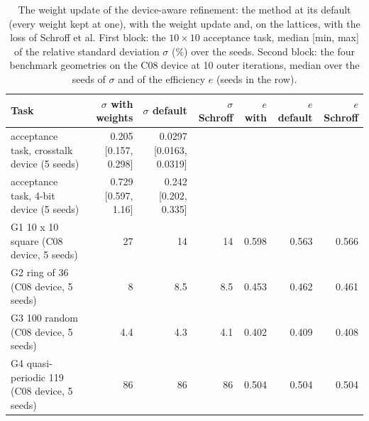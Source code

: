 \begin{table}[t]\centering\footnotesize
\caption{The weight update of the device-aware refinement: the method at its default (every weight kept at one), with the weight update and, on the lattices, with the loss of Schroff et al. First block: the $10\times10$ acceptance task, median [min, max] of the relative standard deviation $\sigma$ (\%) over the seeds. Second block: the four benchmark geometries on the C08 device at 10 outer iterations, median over the seeds of $\sigma$ and of the efficiency $e$ (seeds in the row).}\label{tab:b1-weights}
\begin{tabular}{@{}l r r r r r r@{}}\toprule Task & $\sigma$ with weights & $\sigma$ default & $\sigma$ Schroff & $e$ with & $e$ default & $e$ Schroff\\\midrule
acceptance task, crosstalk device (5 seeds) & 0.205 [0.157, 0.298] & 0.0297 [0.0163, 0.0319] & & & & \\
acceptance task, 4-bit device (5 seeds) & 0.729 [0.597, 1.16] & 0.242 [0.202, 0.335] & & & & \\
G1 10 x 10 square (C08 device, 5 seeds) & 27 & 14 & 14 & 0.598 & 0.563 & 0.566\\
G2 ring of 36 (C08 device, 5 seeds) & 8 & 8.5 & 8.5 & 0.453 & 0.462 & 0.461\\
G3 100 random (C08 device, 5 seeds) & 4.4 & 4.3 & 4.1 & 0.402 & 0.409 & 0.408\\
G4 quasi-periodic 119 (C08 device, 5 seeds) & 86 & 86 & 86 & 0.504 & 0.504 & 0.504\\
\bottomrule\end{tabular}\end{table}
